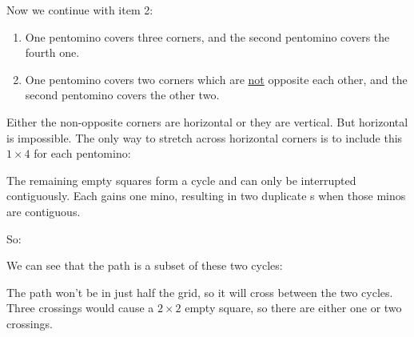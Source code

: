 \documentclass{article}
\newcommand{\pentI}{\smash{\colorbox{colorI!50}{I}}}
\newcommand{\highlight}[1]{\uline{#1}}
\theoremstyle{definition}%
\begin{document}
Now we continue with item 2:
\begin{enumerate}
\item One pentomino covers three corners, and the second pentomino covers the fourth one.
\item One pentomino covers two corners which are \highlight{not} opposite each other, and the second pentomino covers the other two.
\end{enumerate}

Either the non-opposite corners are horizontal or they are vertical. But horizontal is impossible. The only way to stretch across horizontal corners is to include this $1 \times 4$ for each pentomino:
\begin{center}
\end{center}

The remaining empty squares form a cycle and can only be interrupted contiguously. Each  gains one mino, resulting in two duplicate \pentI{}s when those minos are contiguous.

So:
\begin{center}
\end{center}

We can see that the path is a subset of these two cycles:
\begin{center}
\end{center}

The path won't be in just half the grid, so it will cross between the two cycles.
Three crossings would cause a $2 \times 2$ empty square, so there are either one or two crossings.
\end{document}
